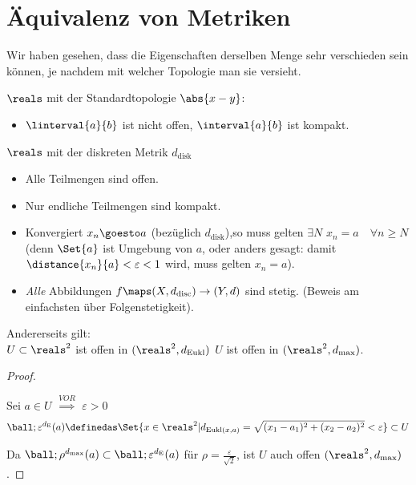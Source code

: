 \section{Äquivalenz von Metriken}
Wir haben gesehen, dass die Eigenschaften derselben Menge sehr verschieden sein können, je nachdem mit welcher Topologie man sie versieht.
\begin{beispiel*}
    \( \reals \) mit der Standardtopologie \( \abs{x-y} \):
    \begin{itemize}
        \item \( \linterval{a}{b} \) ist nicht offen, \( \interval{a}{b} \) ist kompakt.
    \end{itemize}
    \( \reals \) mit der diskreten Metrik \( d_{\text{disk}} \)
    \begin{itemize}
        \item Alle Teilmengen sind offen.
        \item Nur endliche Teilmengen sind kompakt.
        \item Konvergiert \( x_n\goesto a \) (bezüglich \( d_{\text{disk}} \)),so muss gelten \( \exists N \) \sd \( x_n=a\quad \forall n\geq N \) (denn \( \Set{a} \) ist Umgebung von \( a \), oder anders gesagt: damit \( \distance{x_n}{a}<\varepsilon<1 \) wird, muss gelten \( x_n=a \)).
        \item \emph{Alle} Abbildungen \( f\maps (X,d_{\text{disc}})\to (Y,d) \) sind stetig. (Beweis am einfachsten über Folgenstetigkeit).
    \end{itemize}
    Andererseits gilt:\\
    \( U\subset \reals^2 \) ist offen in \( (\reals^2,d_{\text{Eukl}}) \) \tiff \( U \) ist offen in \( (\reals^2, d_{\max}) \).
    \begin{proof}
        \begin{proofdescription}
            \item[\hin] Sei \( a\in U \) \( \overset{VOR}{\implies} \) \texists \( \varepsilon>0 \) \sd
            \begin{align*}
                \ball;{\varepsilon}^{d_\text{E}}(a)\definedas \Set{x\in \reals^2|d_{\text{Eukl}(x,a)}=\sqrt{(x_1-a_1)^2+(x_2-a_2)^2}<\varepsilon}\subset U
            \end{align*} 
        \end{proofdescription}
        Da \( \ball;{\rho}^{d_{\max}}(a)\subset \ball;{\varepsilon}^{d_{\text{E}}}(a) \) für \( \rho=\frac{\varepsilon}{\sqrt{2}} \), ist \( U \) auch offen \( (\reals^2, d_{\max}) \).

\end{proof}
\end{beispiel*}
